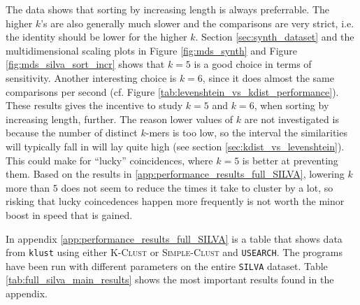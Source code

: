 The data shows that sorting by increasing length is always preferrable. The
higher $k$'s are also generally much slower and the comparisons are very
strict, i.e. the identity should be lower for the higher $k$. Section
\ref{sec:synth_dataset} and the multidimensional scaling plots in Figure
\ref{fig:mds_synth} and Figure \ref{fig:mds_silva_sort_incr} shows that $k=5$
is a good choice in terms of sensitivity. Another interesting choice is $k=6$,
since it does almost the same comparisons per second (cf. Figure
\ref{tab:levenshtein_vs_kdist_performance}). These results gives the incentive
to study $k=5$ and $k=6$, when sorting by increasing length, further. The
reason lower values of $k$ are not investigated is because the number of
distinct $k$-mers is too low, so the interval the similarities will typically
fall in will lay quite high (see section \ref{sec:kdist_vs_levenshtein}). This
could make for ``lucky'' coincidences, where $k=5$ is better at preventing
them. Based on the results in \ref{app:performance_results_full_SILVA},
lowering $k$ more than $5$ does not seem to reduce the times it take to
cluster by a lot, so risking that lucky coincedences happen more frequently is
not worth the minor boost in speed that is gained.

In appendix \ref{app:performance_results_full_SILVA} is a table that shows data
from \texttt{klust} using either \textsc{K-Clust} or \textsc{Simple-Clust} and
\texttt{USEARCH}. The programs have been run with different parameters on the
entire \texttt{SILVA} dataset. Table \ref{tab:full_silva_main_results} shows
the most important results found in the appendix.

